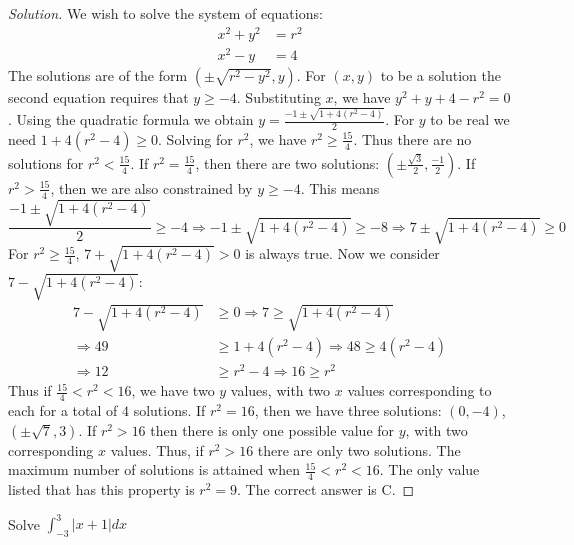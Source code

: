 \documentclass[crop=false,class=book]{standalone}
\begin{document}
        \begin{proof}[Solution]
            We wish to solve the system of equations:
            \begin{align*}
                x^{2}+y^{2}&=r^{2}\\
                x^{2}-y&=4
            \end{align*}
            The solutions are of the form $(\pm \sqrt{r^2-y^2},y)$.
            For $(x,y)$ to be a solution the second equation requires
            that $y\geq -4$. Substituting $x$, we have
            $y^{2}+y+4-r^{2}=0$. Using the quadratic formula we obtain
            $y=\frac{-1\pm\sqrt{1+4(r^{2}-4)}}{2}$. For $y$ to be real
            we need $1+4(r^{2}-4)\geq 0$. Solving for $r^2$, we have
            $r^{2}\geq\frac{15}{4}$. Thus there are no solutions for
            $r^{2}<\frac{15}{4}$. If $r^{2}=\frac{15}{4}$, then there
            are two solutions: 
            $(\pm\frac{\sqrt{3}}{2},\frac{-1}{2})$. If
            $r^{2}>\frac{15}{4}$, then we are
            also constrained by $y\geq-4$. This means 
            \begin{equation*}
                \frac{-1\pm\sqrt{1+4(r^{2}-4)}}{2}\geq-4
                \Rightarrow -1\pm\sqrt{1+4(r^{2}-4)}\geq-8
                \Rightarrow 7\pm\sqrt{1+4(r^{2}-4)}\geq 0
            \end{equation*}
         For $r^2 \geq \frac{15}{4}$, $7+\sqrt{1+4(r^2-4)}>0$ is always true. Now we consider $7-\sqrt{1+4(r^2-4)}:$
        \begin{align*}
            7-\sqrt{1+4(r^{2}-4)}&\geq 0\Rightarrow 7\geq\sqrt{1+4(r^{2}-4)}\\
            \Rightarrow 49&\geq 1+4(r^{2}-4)\Rightarrow 48\geq 4(r^{2}-4)\\
            \Rightarrow 12&\geq r^{2}-4\Rightarrow 16\geq r^{2}
        \end{align*}
        Thus if $\frac{15}{4}<r^2<16$, we have two $y$ values, with two $x$ values corresponding to each for a total of $4$ solutions. If $r^2 = 16$, then we have three solutions: $(0,-4)$, $(\pm \sqrt{7},3)$. If $r^2>16$ then there is only one possible value for $y$, with two corresponding $x$ values. Thus, if $r^2>16$ there are only two solutions. The maximum number of solutions is attained when $\frac{15}{4} < r^2 <16$. The only value listed that has this property is $r^2 = 9$. The correct answer is C.
        \end{proof}
        \begin{problem}
            Solve $\int_{-3}^{3}|x+1|dx$
        \end{problem}
\end{document}
